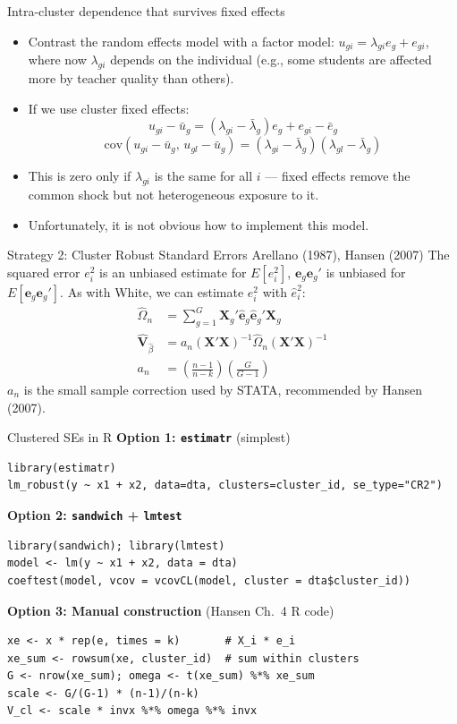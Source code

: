 \documentclass[aspectratio=169, handout, t]{beamer}
\numberwithin{equation}{section}
\begin{document}
  
\begin{frame}{Intra-cluster dependence that survives fixed effects}
\begin{itemize}
\item Contrast the random effects model with a factor model:
$u_{gi}=\lambda_{gi} e_g+e_{gi}$,
where now $\lambda_{gi}$ depends on the individual (e.g., some students are affected more by teacher quality than others). \pause
\item If we use cluster fixed effects:
$$u_{gi}-\bar{u}_g=(\lambda_{gi}-\bar{\lambda}_g) e_g+e_{gi}-\bar{e}_g$$ \pause
$$\text{cov}(u_{gi}-\bar{u}_g,\, u_{gl}-\bar{u}_g)=(\lambda_{gi}-\bar{\lambda}_g)(\lambda_{gl}-\bar{\lambda}_g)$$ \pause
\item This is zero only if $\lambda_{gi}$ is the same for all $i$ --- fixed effects remove the common shock but not heterogeneous exposure to it.\pause
\item Unfortunately, it is not obvious how to implement this model.
\end{itemize}
\end{frame}
 
 
\begin{frame}{Strategy 2: Cluster Robust Standard Errors Arellano (1987), Hansen (2007)}
The squared error $e_i^2$ is an unbiased estimate for $E[e_i^2]$, $\bm{e}_g\bm{e}_g'$ is unbiased for $E[\bm{e}_g\bm{e}_g']$.  As with White, we can estimate $e_i^2$ with  $\hat{e}_i^2$:
\begin{align*}
\hat{\Omega}_n&=\sum_{g=1}^G\bm{X}_g'\bm{\hat{e}}_g\bm{\hat{e}}_g'\bm{X}_g\\
\hat{\bm{V}}_{\hat{\beta}}&=a_n\left(\bm{X}'\bm{X}\right)^{-1}\hat{\Omega}_n\left(\bm{X}'\bm{X}\right)^{-1}\\
a_n&=\left(\frac{n-1}{n-k}\right)\left(\frac{G}{G-1}\right)
\end{align*}
 $a_n$ is the small sample correction used by STATA, recommended by Hansen (2007).
 \end{frame}

\begin{frame}[fragile]{Clustered SEs in R}
\textbf{Option 1: \texttt{estimatr}} (simplest)
\begin{lstlisting}
library(estimatr)
lm_robust(y ~ x1 + x2, data=dta, clusters=cluster_id, se_type="CR2")
\end{lstlisting}\pause
\vspace{-2pt}
\textbf{Option 2: \texttt{sandwich} + \texttt{lmtest}}
\begin{lstlisting}
library(sandwich); library(lmtest)
model <- lm(y ~ x1 + x2, data = dta)
coeftest(model, vcov = vcovCL(model, cluster = dta$cluster_id))
\end{lstlisting}\pause
\vspace{-2pt}
\textbf{Option 3: Manual construction} (Hansen Ch.\ 4 R code)
\begin{lstlisting}
xe <- x * rep(e, times = k)       # X_i * e_i
xe_sum <- rowsum(xe, cluster_id)  # sum within clusters
G <- nrow(xe_sum); omega <- t(xe_sum) %*% xe_sum
scale <- G/(G-1) * (n-1)/(n-k)
V_cl <- scale * invx %*% omega %*% invx
\end{lstlisting}
\end{frame}
\end{document}
